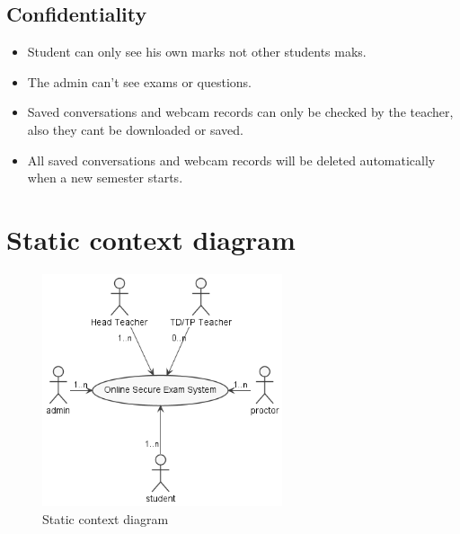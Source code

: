 \documentclass[]{uc2pfecaneva}
\begin{document}
    \raggedright\subsection{Confidentiality}
    \begin{itemize}
        \item Student can only see his own marks not other students maks.
        \item The admin can’t see exams or questions.
        \item Saved conversations and webcam records can only be checked by the teacher, also they cant be downloaded or saved.
        \item All saved conversations and webcam records will be deleted automatically when a new semester starts.
    \end{itemize}

    \raggedright\section{Static context diagram}
    \begin{figure}[h]

        \centering
        \includegraphics[width=200pt]{images/SCD}
        \caption{Static context diagram}
    \end{figure}


\end{document}

